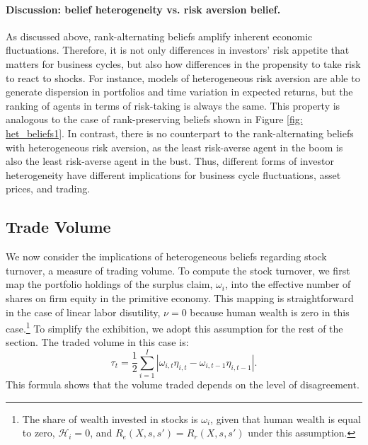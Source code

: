 \paragraph{Discussion: belief heterogeneity vs. risk aversion belief.} 
As discussed above, rank-alternating beliefs amplify inherent economic fluctuations.
Therefore, it is not only differences in investors' risk appetite that matters for business cycles, but also how differences in the propensity to take risk to react to shocks. 
For instance, models of heterogeneous risk aversion are able to generate dispersion in portfolios and time variation in expected returns, but the ranking of agents in terms of risk-taking is always the same.
This property is analogous to the case of rank-preserving beliefs shown in Figure \ref{fig: het_beliefs1}.
In contrast, there is no counterpart to the rank-alternating beliefs with heterogeneous risk aversion, as the least risk-averse agent in the boom is also the least risk-averse agent in the bust.
Thus, different forms of investor heterogeneity have different implications for business cycle fluctuations, asset prices, and trading.


\subsection{Trade Volume}

We now consider the implications of heterogeneous beliefs regarding stock turnover, a measure of trading volume. To compute the stock turnover, we first map the portfolio holdings of the surplus claim, $\omega_i$, into the effective number of shares on firm equity in the primitive economy. This mapping is straightforward in the case of linear labor disutility, $\nu = 0$ because human wealth is zero in this case.\footnote{The share of wealth invested in stocks is $\omega_i$, given that human wealth is equal to zero, $\mathcal{H}_i = 0$, and $R_{e}(X,s,s') = R_{r}(X,s,s')$ under this assumption.} To simplify the exhibition, we adopt this assumption for the rest of the section. The traded volume in this case is:
\begin{equation}
    \tau_t = \frac{1}{2} \sum_{i=1}^I |\omega_{i,t} \eta_{i,t} - \omega_{i,t-1} \eta_{i,t-1} |.\nonumber
\end{equation} 
This formula shows that the volume traded depends on the level of disagreement. 

